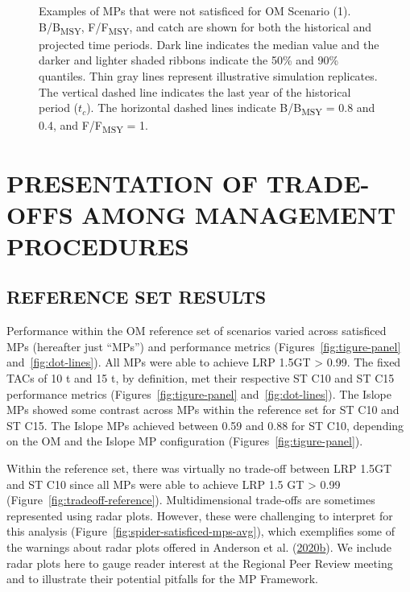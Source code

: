 \documentclass[11pt]{book}
\begin{document}
\begin{figure}[htb]

{\centering {} 

}

\caption{Examples of MPs that were not satisficed for OM Scenario (1). B/B\textsubscript{MSY}, F/F\textsubscript{MSY}, and catch are shown for both the historical and projected time periods. Dark line indicates the median value and the darker and lighter shaded ribbons indicate the 50\% and 90\% quantiles. Thin gray lines represent illustrative simulation replicates. The vertical dashed line indicates the last year of the historical period (\(t_c\)). The horizontal dashed lines indicate B/B\textsubscript{MSY} = 0.8 and 0.4, and F/F\textsubscript{MSY} = 1.}\label{fig:proj-not-satisficed-eg}
\end{figure}
\clearpage

\hypertarget{sec:results}{%
\section{PRESENTATION OF TRADE-OFFS AMONG MANAGEMENT PROCEDURES}\label{sec:results}}

\hypertarget{reference-set-results}{%
\subsection{REFERENCE SET RESULTS}\label{reference-set-results}}

Performance within the OM reference set of scenarios varied across satisficed MPs (hereafter just ``MPs'') and performance metrics (Figures~\ref{fig:tigure-panel} and~\ref{fig:dot-lines}). All MPs were able to achieve LRP 1.5GT \textgreater{} 0.99. The fixed TACs of 10 t and 15 t, by definition, met their respective ST C10 and ST C15 performance metrics (Figures~\ref{fig:tigure-panel} and~\ref{fig:dot-lines}). The Islope MPs showed some contrast across MPs within the reference set for ST C10 and ST C15. The Islope MPs achieved between 0.59 and 0.88 for ST C10, depending on the OM and the Islope MP configuration (Figures~\ref{fig:tigure-panel}).

Within the reference set, there was virtually no trade-off between LRP 1.5GT and ST C10 since all MPs were able to achieve LRP 1.5 GT \textgreater{} 0.99 (Figure~\ref{fig:tradeoff-reference}). Multidimensional trade-offs are sometimes represented using radar plots. However, these were challenging to interpret for this analysis (Figure~\ref{fig:spider-satisficed-mps-avg}), which exemplifies some of the warnings about radar plots offered in Anderson et al. (\protect\hyperlink{ref-anderson2020gfmp}{2020}\protect\hyperlink{ref-anderson2020gfmp}{b}). We include radar plots here to gauge reader interest at the Regional Peer Review meeting and to illustrate their potential pitfalls for the MP Framework.
\end{document}
